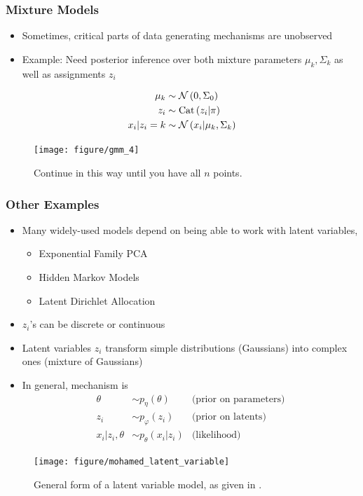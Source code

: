 \documentclass[10pt,mathserif]{beamer}
\begin{document}
\label{sec:latent_variable_models}
\begin{frame}
  \frametitle{Mixture Models}
  \begin{itemize}
  \item Sometimes, critical parts of data generating mechanisms are unobserved
    \item Example: Need posterior inference over both mixture parameters $\mu_k,
      \Sigma_k$ as well as assignments $z_i$
  \end{itemize}
  \begin{align*}
    \mu_{k} &\sim \mathcal{N}\left(0, \Sigma_{0}\right) \\
    z_i &\sim \textnormal{Cat}\left(z_i \vert \pi\right) \\
    x_i \vert z_i = k &\sim \mathcal{N}\left(x_i \vert \mu_{k}, \Sigma_k\right)
  \end{align*}
\begin{figure}[ht]
  \centering
  \texttt{[image: figure/gmm\_4]}
  \caption{Continue in this way until you have all $n$ points. \label{fig:gmm_4}}
\end{figure}
\end{frame}

\begin{frame}
  \frametitle{Other Examples}
  \begin{itemize}
  \item Many widely-used models depend on being able to work with latent variables,
    \begin{itemize}
    \item Exponential Family PCA
    \item Hidden Markov Models
    \item Latent Dirichlet Allocation
    \end{itemize}
  \item $z_i$'s can be discrete or continuous
  \item Latent variables $z_i$ transform simple distributions (Gaussians) into
    complex ones (mixture of Gaussians)
  \item In general, mechanism is
    \begin{align*}
      \theta &\sim p_{\eta}\left(\theta\right) &\text{(prior on parameters)} \\
      z_{i} &\sim p_{\varphi}\left(z_{i}\right) &\text{(prior on latents)} \\
      x_{i} \vert z_{i}, \theta &\sim p_{\theta}\left(x_{i} \vert z_{i} \right) &\text{(likelihood)}
    \end{align*}
  \end{itemize}
  \begin{figure}[ht]
    \centering
    \texttt{[image: figure/mohamed\_latent\_variable]}
    \caption{General form of a latent variable model, as given in
      \citep{mohamed2011generalised}. 
       \label{fig:mohamed_latent_variable} }
  \end{figure}
\end{frame}
\end{document}
